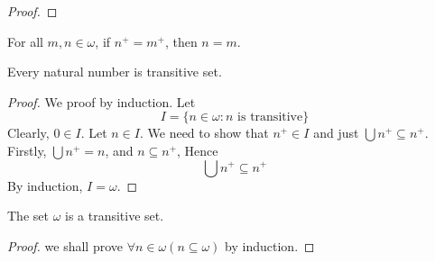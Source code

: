 \begin{proof}
    
\end{proof}

\begin{proposition}{}{}
    For all $m,n \in \omega$, if $n^{+} = m^{+}$, then $n = m$.
\end{proposition}

\begin{theorem}{}{}
    Every natural number is transitive set.
\end{theorem}

\begin{proof}
    We proof by induction. Let
    \begin{equation*}
        I = \{ n \in \omega : n \text{ is transitive}\}
    \end{equation*}
    Clearly, $0 \in I$. Let $n \in I$. We need to show that $n^{+} \in I$ and just $\bigcup n^{+} \subseteq n^{+}$.\\
    Firstly, $\bigcup n^{+} = n$, and $n \subseteq n^{+}$, Hence
    \begin{equation*}
        \bigcup n^{+} \subseteq n^{+}
    \end{equation*}
    By induction, $I = \omega$.
\end{proof}

\begin{theorem}{}{}
    The set $\omega$ is a transitive set.
\end{theorem}

\begin{proof}
    we shall prove $\forall n \in \omega(n \subseteq \omega)$ by induction.
\end{proof}
